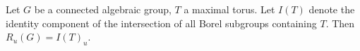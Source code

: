 Let $G$ be a connected algebraic group, $T$ a maximal torus. Let $I(T)$ denote the identity component of the intersection of all Borel subgroups containing $T$. Then $R_u(G) = I(T)_u$.
